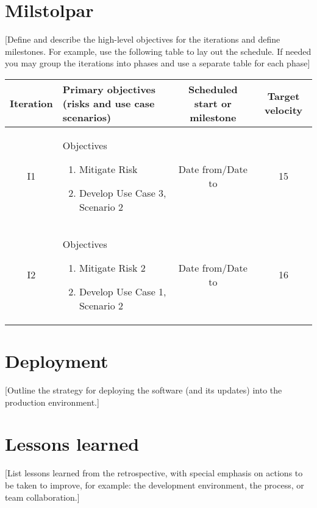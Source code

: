 \section{Milstolpar}
[Define and describe the high-level objectives for the iterations and define milestones. For example, use the following table to lay out the schedule. If needed you may group the iterations into phases and use a separate table for each phase]
\begin{center}
    \begin{tabular}{ | c | m{6cm}  | c | c |}
    \hline
    Iteration & Primary objectives (risks and use case scenarios) & Scheduled start or milestone & Target velocity \\
    \hline
    I1 & Objectives \begin{enumerate} \item Mitigate Risk \item Develop Use Case 3, Scenario 2 \end{enumerate} & Date from/Date to & 15 \\
    \hline
	I2 & Objectives \begin{enumerate} \item Mitigate Risk 2 \item Develop Use Case 1, Scenario 2 \end{enumerate} & Date from/Date to & 16 \\
\hline
    \end{tabular}
\end{center}

\section{Deployment}
[Outline the strategy for deploying the software (and its updates) into the production environment.]
\section{Lessons learned}
[List lessons learned from the retrospective, with special emphasis on actions to be taken to improve, for example: the development environment, the process, or team collaboration.]

